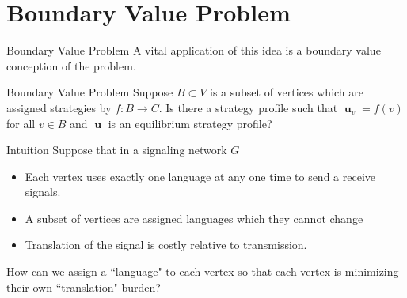 \documentclass{beamer}
\DeclareMathOperator{\uu}{\mathbf{u}}
\begin{document}
\section{Boundary Value Problem}
\begin{frame}{Boundary Value Problem}
	A vital application of this idea is a boundary value conception of the problem.
	\begin{block}{Boundary Value Problem}
		Suppose $B\subset V$ is a subset of vertices which are assigned strategies by $f:B\rightarrow C$. Is there a strategy profile such that $\uu_v=f(v)$ for all $v\in B$ and $\uu$ is an equilibrium strategy profile?
	\end{block}
\end{frame}
\begin{frame}{Intuition}
	Suppose that in  a signaling network $G$
	\begin{itemize}
		\item Each vertex uses exactly one language at any one time to send a receive signals. 
		\item A subset of vertices are assigned languages which they cannot change
		\item Translation of the signal is costly relative to transmission. 
	\end{itemize}

	How can we assign a ``language" to each vertex so that each vertex is minimizing their own ``translation" burden?
\end{frame}
\end{document}
